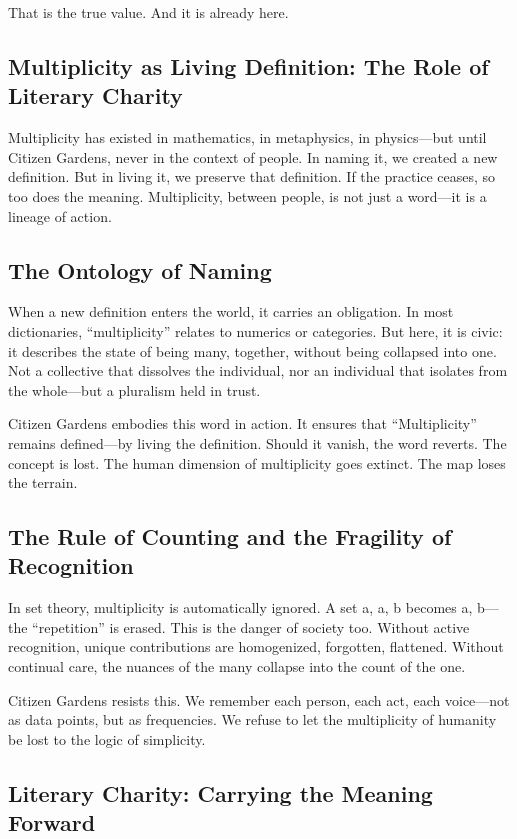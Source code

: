 \documentclass[12pt]{article}
\begin{document}
That is the true value. And it is already here.

\subsection*{Multiplicity as Living Definition: The Role of Literary Charity}

Multiplicity has existed in mathematics, in metaphysics, in physics—but until Citizen Gardens, never in the context of people. In naming it, we created a new definition. But in living it, we preserve that definition. If the practice ceases, so too does the meaning. Multiplicity, between people, is not just a word—it is a lineage of action.

\subsection{The Ontology of Naming}

When a new definition enters the world, it carries an obligation. In most dictionaries, “multiplicity” relates to numerics or categories. But here, it is civic: it describes the state of being many, together, without being collapsed into one. Not a collective that dissolves the individual, nor an individual that isolates from the whole—but a pluralism held in trust.

Citizen Gardens embodies this word in action. It ensures that “Multiplicity” remains defined—by living the definition. Should it vanish, the word reverts. The concept is lost. The human dimension of multiplicity goes extinct. The map loses the terrain.

\subsection{The Rule of Counting and the Fragility of Recognition}

In set theory, multiplicity is automatically ignored. A set {a, a, b} becomes {a, b}—the “repetition” is erased. This is the danger of society too. Without active recognition, unique contributions are homogenized, forgotten, flattened. Without continual care, the nuances of the many collapse into the count of the one.

Citizen Gardens resists this. We remember each person, each act, each voice—not as data points, but as frequencies. We refuse to let the multiplicity of humanity be lost to the logic of simplicity.

\subsection{Literary Charity: Carrying the Meaning Forward}
\end{document}
